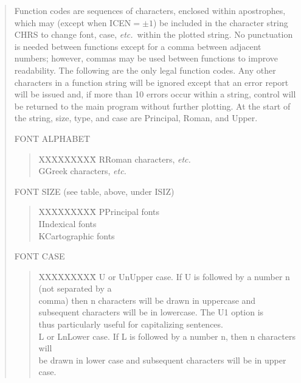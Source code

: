 \begin{quote}
Function codes are sequences of characters, enclosed within
apostrophes, which may (except when ICEN$=\pm1$) be included in the
character string CHRS to change font, case, {\em etc.}\ within the plotted
string.
No punctuation is needed between functions except for a
comma between adjacent numbers;  however, commas may be used between
functions to improve readability.
The following are the only legal
function codes.
Any other characters in a function string will be
ignored except that an error report will be issued and, if more
than 10 errors occur within a string, control will be returned to
the main program without further plotting.
At the start of the
string, size, type, and case are Principal, Roman, and Upper.

FONT ALPHABET

\begin{quote}
\begin{tabbing}
XXXXXXXXX\=\kill
R\>Roman characters, {\em etc.}\\
G\>Greek characters, {\em etc.}
\end{tabbing}
\end{quote}

FONT SIZE (see table, above, under ISIZ)

\begin{quote}
\begin{tabbing}
XXXXXXXXX\=\kill
P\>Principal fonts\\
I\>Indexical fonts\\
K\>Cartographic fonts
\end{tabbing}
\end{quote}

FONT CASE

\begin{quote}
\begin{tabbing}
XXXXXXXXX\=\kill
U or Un\>Upper case.  If U is followed by a number n (not separated by a\\
\>comma) then n characters will be drawn in uppercase and\\
\>subsequent characters will be in lowercase.  The U1 option is\\
\>thus particularly useful for capitalizing sentences.\\
L or Ln\>Lower case.  If L is followed by a number n, then n characters will\\
\>be drawn in lower case and subsequent characters will be in upper\\
\>case.
\end{tabbing}
\end{quote}


\end{quote}
